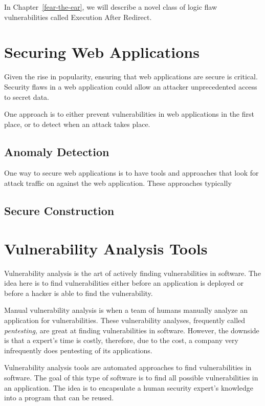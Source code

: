 In Chapter~\ref{fear-the-ear}, we will describe a novel class of logic
flaw vulnerabilities called Execution After Redirect.

\section{Securing Web Applications}

Given the rise in popularity, ensuring that web applications are
secure is critical. Security flaws in a web application could allow an
attacker unprecedented access to secret data. 

One approach is to either prevent vulnerabilities in web applications
in the first place, or to detect when an attack takes place. 

\subsection{Anomaly Detection}

One way to secure web applications is to have tools and approaches
that look for attack traffic on against the web application. These
approaches typically 

\subsection{Secure Construction}

\section{Vulnerability Analysis Tools}

Vulnerability analysis is the art of actively finding vulnerabilities
in software. The idea here is to find vulnerabilities either before an
application is deployed or before a hacker is able to find the
vulnerability. 

Manual vulnerability analysis is when a team of humans manually
analyze an application for vulnerabilities. These vulnerability
analyses, frequently called \emph{pentesting,} are great at finding
vulnerabilities in software. However, the downside is that a expert's
time is costly, therefore, due to the cost, a company very
infrequently does pentesting of its applications.

Vulnerability analysis tools are automated approaches to find
vulnerabilities in software. The goal of this type of software is to
find all possible vulnerabilities in an application. The idea is to
encapsulate a human security expert's knowledge into a program that
can be reused. 

